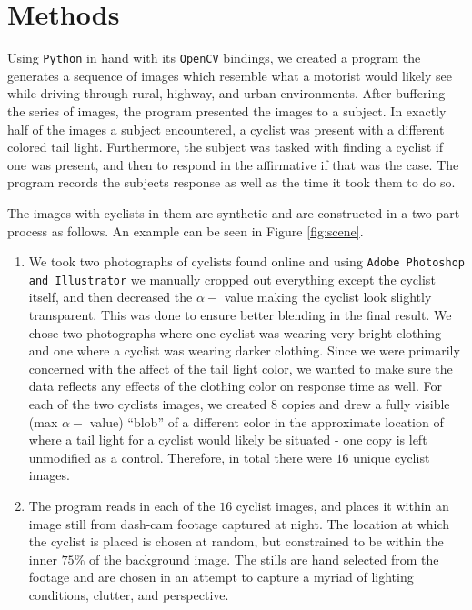 \section{Methods}

Using \texttt{Python} in hand with its \texttt{OpenCV} bindings, we created a
program the generates a sequence of images which resemble what a motorist would
likely see while driving through rural, highway, and urban environments. After buffering
the series of images, the program presented the images to a subject. In exactly
half of the images a subject encountered, a cyclist was present with a
different colored tail light. Furthermore, the subject was tasked with finding
a cyclist if one was present, and then to respond in the affirmative if that
was the case. The program records the subjects response as well as the time it
took them to do so.

\smallskip
The images with cyclists in them are synthetic and are constructed in 
a two part process as follows. An example can be seen in Figure \ref{fig:scene}.

\begin{enumerate}

    \item We took two photographs of cyclists found online and using
        \texttt{Adobe Photoshop and Illustrator} we manually cropped out
        everything except the cyclist itself, and then decreased the $\alpha-$
        value making the cyclist look slightly transparent. This was done to
        ensure better blending in the final result. We chose two photographs
        where one cyclist was wearing very bright clothing and one where a
        cyclist was wearing darker clothing. Since we were primarily concerned
        with the affect of the tail light color, we wanted to make sure the
        data reflects any effects of the clothing color on response time as
        well.  For each of the two cyclists images, we created $8$ copies and
        drew a fully visible (max $\alpha-$ value) ``blob'' of a different
        color in the approximate location of where a tail light for a cyclist
        would likely be situated - one copy is left unmodified as a control.
        Therefore, in total there were $16$ unique cyclist images. 

    \item The program reads in each of the $16$ cyclist images, and places it
        within an image still from dash-cam footage captured at night.  The
        location at which the cyclist is placed is chosen at random, but
        constrained to be within the inner $75\%$ of the background image. The
        stills are hand selected from the footage and are chosen in an attempt
        to capture a myriad of lighting conditions, clutter, and perspective.

\end{enumerate}

